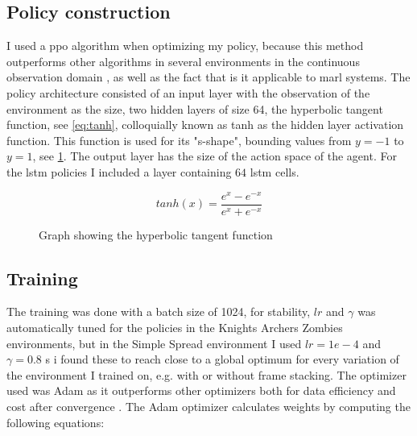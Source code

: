 \documentclass[UKenglish]{uiomasterthesis}
\begin{document}
\subsection{Policy construction}
I used a \ac{ppo} algorithm when optimizing my policy, because this method outperforms other algorithms in several environments in the continuous observation domain \cite{schulman2017proximalpolicyoptimizationalgorithms}, as well as the fact that is it applicable to \ac{marl} systems. The policy architecture consisted of an input layer with the observation of the environment as the size, two hidden layers of size 64, the hyperbolic tangent function, see \cref{eq:tanh}, colloquially known as tanh as the hidden layer activation function. This function is used for its "s-shape", bounding values from $y=-1$ to $y=1$, see \cref{fig:tanh}. The output layer has the size of the action space of the agent. For the \ac{lstm} policies I included a layer containing $64$ \ac{lstm} cells.

\begin{equation}
\label{eq:tanh}
tanh(x) = \frac{e^x-e^{-x}}{e^x+e^{-x}}
\end{equation}

\begin{figure}[hbtp]
\centering
{}
\caption{Graph showing the hyperbolic tangent function}
\label{fig:tanh}
\end{figure}

\subsection{Training}
The training was done with a batch size of 1024, for stability, $lr$ and $\gamma$ was automatically tuned for the policies in the Knights Archers Zombies environments, but in the Simple Spread environment I used $lr = 1e-4$ and $\gamma = 0.8$ s i found these to reach close to a global optimum for every variation of the environment I trained on, e.g. with or without frame stacking. The optimizer used was Adam as it outperforms other optimizers both for data efficiency and cost after convergence \cite{adam_optim}. The Adam optimizer calculates weights by computing the following equations:
\end{document}
